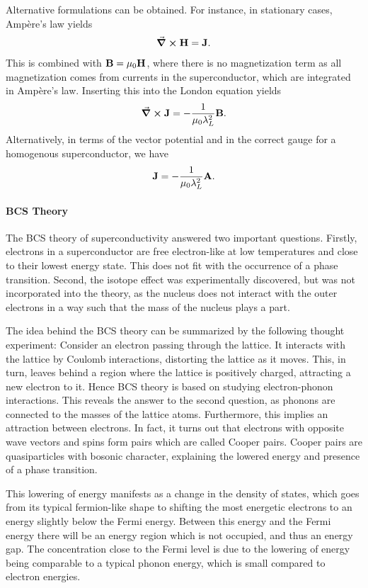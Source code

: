 Alternative formulations can be obtained. For instance, in stationary cases, Ampère's law yields
\begin{align*}
	\curl{\vb{H}} = \vb{J}.
\end{align*}
This is combined with $\vb{B} = \mu_{0}\vb{H}$, where there is no magnetization term as all magnetization comes from currents in the superconductor, which are integrated in Ampère's law. Inserting this into the London equation yields
\begin{align*}
	\curl{\vb{J}} = -\frac{1}{\mu_{0}\lambda_{L}^{2}}\vb{B}.
\end{align*}
Alternatively, in terms of the vector potential and in the correct gauge for a homogenous superconductor, we have
\begin{align*}
	\vb{J} = -\frac{1}{\mu_{0}\lambda_{L}^{2}}\vb{A}.
\end{align*}

\paragraph{BCS Theory}
The BCS theory of superconductivity answered two important questions. Firstly, electrons in a superconductor are free electron-like at low temperatures and close to their lowest energy state. This does not fit with the occurrence of a phase transition. Second, the isotope effect was experimentally discovered, but was not incorporated into the theory, as the nucleus does not interact with the outer electrons in a way such that the mass of the nucleus plays a part.

The idea behind the BCS theory can be summarized by the following thought experiment: Consider an electron passing through the lattice. It interacts with the lattice by Coulomb interactions, distorting the lattice as it moves. This, in turn, leaves behind a region where the lattice is positively charged, attracting a new electron to it. Hence BCS theory is based on studying electron-phonon interactions. This reveals the answer to the second question, as phonons are connected to the masses of the lattice atoms. Furthermore, this implies an attraction between electrons. In fact, it turns out that electrons with opposite wave vectors and spins form pairs which are called Cooper pairs. Cooper pairs are quasiparticles with bosonic character, explaining the lowered energy and presence of a phase transition.

This lowering of energy manifests as a change in the density of states, which goes from its typical fermion-like shape to shifting the most energetic electrons to an energy slightly below the Fermi energy. Between this energy and the Fermi energy there will be an energy region which is not occupied, and thus an energy gap. The concentration close to the Fermi level is due to the lowering of energy being comparable to a typical phonon energy, which is small compared to electron energies.

